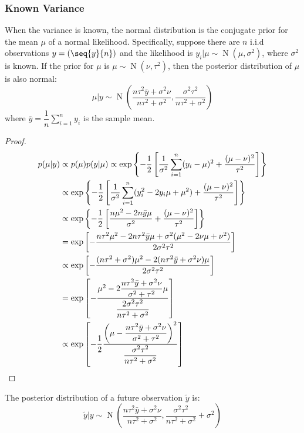 \subsubsection{Known Variance}
\begin{theorem}
	When the variance is known, the normal distribution is the conjugate prior for the mean $\mu$ of a normal likelihood. Specifically, suppose there are $n$ i.i.d observations $y=(\seq{y}{n})$ and the likelihood is $y_i|\mu\sim\operatorname{N}(\mu,\sigma^2)$, where $\sigma^2$ is known. If the prior for $\mu$ is $\mu\sim\operatorname{N}(\nu,\tau^2)$, then the posterior distribution of $\mu$ is also normal:
	\begin{equation*}
		\mu|y\sim\operatorname{N}\left(\frac{n\tau^2\bar{y} + \sigma^2\nu}{n\tau^2 + \sigma^2}, \frac{\sigma^2\tau^2}{n\tau^2 + \sigma^2}\right)
	\end{equation*}
	where $\bar{y} = \dfrac{1}{n}\sum\limits_{i=1}^n y_i$ is the sample mean.
\end{theorem}
\begin{proof}
	\begin{align*}
		p(\mu|y)&\propto p(\mu)p(y|\mu)\propto
		\exp\left\{-\frac{1}{2}\left[\frac{1}{\sigma^2}\sum_{i=1}^{n}(y_i-\mu)^2+\frac{(\mu-\nu)^2}{\tau^2}\right]\right\} \\
		&\propto\exp\left\{-\frac{1}{2}\left[\frac{1}{\sigma^2}\sum_{i=1}^{n}(y_i^2-2y_i\mu+\mu^2)+\frac{(\mu-\nu)^2}{\tau^2}\right]\right\} \\
		&\propto\exp\left\{-\frac{1}{2}\left[\frac{n\mu^2-2n\bar{y}\mu}{\sigma^2}+\frac{(\mu-\nu)^2}{\tau^2}\right]\right\} \\
		&=\exp\left[-\frac{n\tau^2\mu^2-2n\tau^2\bar{y}\mu+\sigma^2(\mu^2-2\nu\mu+\nu^2)}{2\sigma^2\tau^2}\right] \\
		&\propto\exp\left[-\frac{(n\tau^2+\sigma^2)\mu^2-2(n\tau^2\bar{y}+\sigma^2\nu)\mu}{2\sigma^2\tau^2}\right] \\
		&=\exp\left[-\frac{\mu^2-2\dfrac{n\tau^2\bar{y}+\sigma^2\nu}{\sigma^2+\tau^2}\mu}{\dfrac{2\sigma^2\tau^2}{n\tau^2+\sigma^2}}\right] \\
		&\propto\exp\left[-\frac{1}{2}\frac{\left(\mu-\dfrac{n\tau^2\bar{y}+\sigma^2\nu}{\sigma^2+\tau^2}\right)^2}{\dfrac{\sigma^2\tau^2}{n\tau^2+\sigma^2}}\right]\qedhere
	\end{align*}
\end{proof}
\begin{theorem}
	The posterior distribution of a future observation $\tilde{y}$ is:
	\begin{equation*}
		\tilde{y}|y\sim\operatorname{N}\left(\frac{n\tau^2\bar{y}+\sigma^2\nu}{n\tau^2+\sigma^2},\frac{\sigma^2\tau^2}{n\tau^2+\sigma^2}+\sigma^2\right)
	\end{equation*}
\end{theorem}

